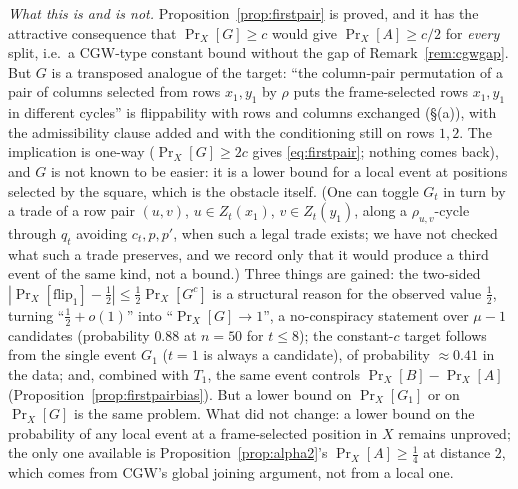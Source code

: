 \emph{What this is and is not.}  Proposition~\ref{prop:firstpair} is
proved, and it has the attractive consequence that
$\Pr_X[G]\ge c$ would give $\Pr_X[A]\ge c/2$ for \emph{every} split,
i.e.\ a CGW-type constant bound without the gap of
Remark~\ref{rem:cgwgap}.  But $G$ is a transposed analogue of the
target: ``the column-pair permutation of a pair of columns selected
from rows $x_1,y_1$ by $\rho$ puts the frame-selected rows $x_1,y_1$ in
different cycles'' is flippability with rows and columns exchanged
(\S(a)), with the admissibility clause added and with the conditioning
still on rows $1,2$.  The implication is one-way
($\Pr_X[G]\ge2c$ gives \eqref{eq:firstpair}; nothing comes back), and
$G$ is not known to be easier: it is a lower bound for a local event
at positions selected by the square, which is the obstacle itself.
(One can toggle $G_t$ in turn by a trade of a row pair $(u,v)$,
$u\in Z_t(x_1)$, $v\in Z_t(y_1)$, along a $\rho_{u,v}$-cycle through
$q_t$ avoiding $c_t,p,p'$, when such a legal trade exists; we have not
checked what such a trade preserves, and we record only that it would
produce a third event of the same kind, not a bound.)  Three things are
gained: the two-sided
$|\Pr_X[\mathrm{flip}_1]-\tfrac12|\le\tfrac12\Pr_X[G^c]$ is a structural
reason for the observed value $\tfrac12$, turning ``$\tfrac12+o(1)$''
into ``$\Pr_X[G]\to1$'', a no-conspiracy statement over $\mu-1$
candidates (probability $0.88$ at $n=50$ for $t\le8$); the
constant-$c$ target follows from the single event $G_1$ ($t=1$ is
always a candidate), of probability $\approx0.41$ in the data; and,
combined with $T_1$, the same event controls $\Pr_X[B]-\Pr_X[A]$
(Proposition~\ref{prop:firstpairbias}).  But a lower bound on
$\Pr_X[G_1]$ or on $\Pr_X[G]$ is the same problem.
What did not change: a lower bound on the probability of any local
event at a frame-selected position in $X$ remains unproved; the only
one available is Proposition~\ref{prop:alpha2}'s $\Pr_X[A]\ge\tfrac14$
at distance $2$, which comes from CGW's global joining argument, not
from a local one.


